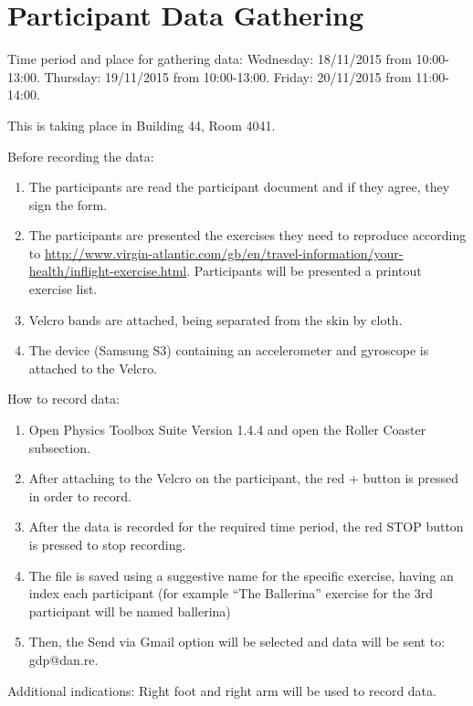 \chapter{Participant Data Gathering}\label{app:participant}

Time period and place for gathering data:\newline
Wednesday: 18/11/2015 from 10:00-13:00.\newline
Thursday: 19/11/2015 from 10:00-13:00.\newline
Friday: 20/11/2015 from 11:00-14:00.\newline

This is taking place in Building 44, Room 4041.  

Before recording the data:
\begin{enumerate}
  \item The participants are read the participant document and if they agree, they sign the form.
  \item The participants are presented the exercises they need to reproduce according to \url{http://www.virgin-atlantic.com/gb/en/travel-information/your-health/inflight-exercise.html}. Participants will be presented a printout exercise list.
  \item Velcro bands are attached, being separated from the skin by cloth.
  \item The device (Samsung S3) containing an accelerometer and gyroscope is attached to the Velcro.
\end{enumerate}

How to record data:
\begin{enumerate}
  \item Open Physics Toolbox Suite Version 1.4.4 and open the Roller Coaster subsection.
  \item After attaching to the Velcro on the participant, the red + button is pressed in order to record.
  \item After the data is recorded for the required time period, the red STOP button is pressed to stop recording.
  \item The file is saved using a suggestive name for the specific exercise, having an index each participant (for example ``The Ballerina'' exercise for the 3rd participant will be named ballerina)
  \item Then, the Send via Gmail option will be selected and data will be sent to: gdp@dan.re.
\end{enumerate}

Additional indications:\newline
Right foot and right arm will be used to record data.
